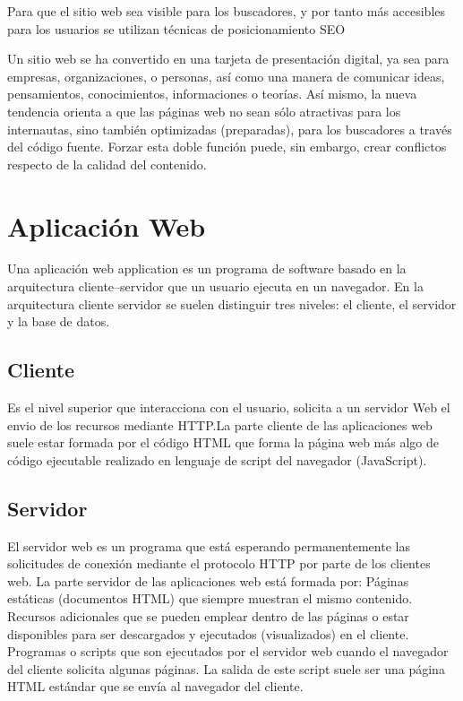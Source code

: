 Para que el sitio web sea visible para los buscadores, y por tanto más accesibles para los usuarios se utilizan técnicas de posicionamiento SEO

Un sitio web se ha convertido en una tarjeta de presentación digital, ya sea para empresas, organizaciones, o personas, así como una manera de comunicar ideas, pensamientos, conocimientos, informaciones o teorías. Así mismo, la nueva tendencia orienta a que las páginas web no sean sólo atractivas para los internautas, sino también optimizadas (preparadas), para los buscadores a través del código fuente. Forzar esta doble función puede, sin embargo, crear conflictos respecto de la calidad del contenido.


\section{Aplicación Web}

Una aplicación web application es un programa de software basado en la arquitectura cliente–servidor que un usuario ejecuta en un navegador. En la arquitectura cliente servidor se suelen distinguir tres niveles: el cliente, el servidor y la base de datos.


\subsection{Cliente} 
Es el nivel superior que interacciona con el usuario, solicita a un servidor Web el envio de los recursos mediante HTTP.La parte cliente de las aplicaciones web suele estar formada por el código HTML que forma la página web más algo de código ejecutable realizado en lenguaje de script del navegador (JavaScript).


\subsection{Servidor} 
El servidor web es un programa que está esperando permanentemente las solicitudes de conexión mediante el protocolo HTTP por parte de los clientes web. 
La parte servidor de las aplicaciones web está formada por:
Páginas estáticas (documentos HTML) que siempre muestran el mismo contenido.
Recursos adicionales que se pueden emplear dentro de las páginas o estar disponibles para ser descargados y ejecutados (visualizados) en el cliente.
Programas o scripts que son ejecutados por el servidor web cuando el navegador del cliente solicita algunas páginas. La salida de este script suele ser una página HTML estándar que se envía al navegador del cliente.




